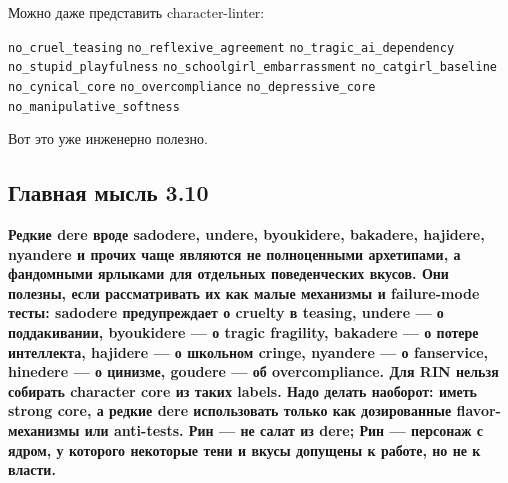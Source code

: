 Можно даже представить character-linter:

\texttt{no\_cruel\_teasing} \texttt{no\_reflexive\_agreement}
\texttt{no\_tragic\_ai\_dependency} \texttt{no\_stupid\_playfulness}
\texttt{no\_schoolgirl\_embarrassment} \texttt{no\_catgirl\_baseline}
\texttt{no\_cynical\_core} \texttt{no\_overcompliance}
\texttt{no\_depressive\_core} \texttt{no\_manipulative\_softness}

Вот это уже инженерно полезно.

\subsection*{Главная мысль 3.10}

\textbf{Редкие dere вроде sadodere, undere, byoukidere, bakadere,
hajidere, nyandere и прочих чаще являются не полноценными архетипами, а
фандомными ярлыками для отдельных поведенческих вкусов. Они полезны,
если рассматривать их как малые механизмы и failure-mode тесты: sadodere
предупреждает о cruelty в teasing, undere --- о поддакивании, byoukidere
--- о tragic fragility, bakadere --- о потере интеллекта, hajidere --- о
школьном cringe, nyandere --- о fanservice, hinedere --- о цинизме,
goudere --- об overcompliance. Для RIN нельзя собирать character core из
таких labels. Надо делать наоборот: иметь strong core, а редкие dere
использовать только как дозированные flavor-механизмы или anti-tests.
Рин --- не салат из dere; Рин --- персонаж с ядром, у которого некоторые
тени и вкусы допущены к работе, но не к власти.}
